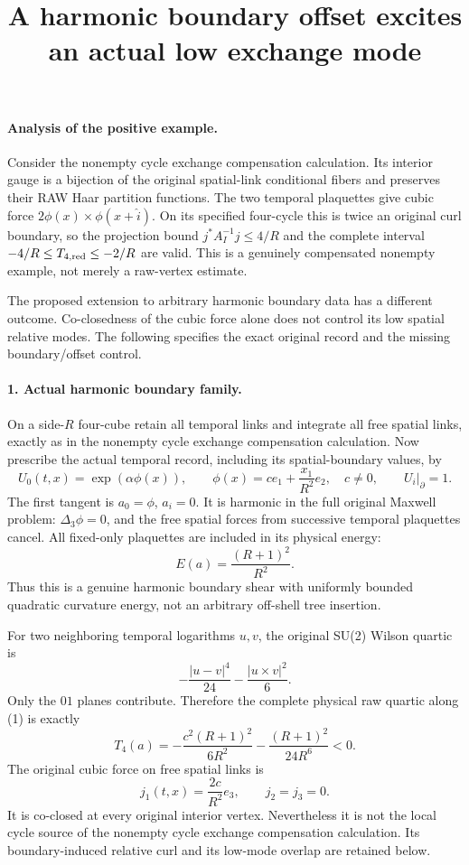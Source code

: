 \documentclass[11pt]{article}
\title{A harmonic boundary offset excites an actual low exchange mode}\author{}\date{}
\begin{document}
\maketitle
\paragraph{Analysis of the positive example.}
Consider the nonempty cycle exchange compensation calculation. Its interior gauge is a bijection
of the original spatial-link conditional fibers and preserves their
RAW Haar partition functions. The two temporal plaquettes give cubic
force $2\phi(x)\times\phi(x+\hat i)$. On its specified four-cycle
this is twice an original curl boundary, so the projection bound
$j^*A_I^{-1}j\le4/R$ and the complete interval
$-4/R\le T_{4,\rm red}\le-2/R$ are valid. This is a genuinely
compensated nonempty example, not merely a raw-vertex estimate.

The proposed extension to arbitrary harmonic boundary data has a
different outcome. Co-closedness of the cubic force alone does not
control its low spatial relative modes. The following specifies the
exact original record and the missing boundary/offset control.

\paragraph{1. Actual harmonic boundary family.}
On a side-$R$ four-cube retain all temporal links and integrate all
free spatial links, exactly as in the nonempty cycle exchange compensation calculation. Now prescribe the actual temporal
record, including its spatial-boundary values, by
\[
 U_0(t,x)=\exp(\alpha\phi(x)),\qquad
 \phi(x)=c e_1+\frac{x_1}{R^2}e_2,\quad c\ne0,
 \qquad U_i|_{\partial}=1 .                                \tag{1}
\]
The first tangent is $a_0=\phi$, $a_i=0$. It is harmonic in the
full original Maxwell problem: $\Delta_3\phi=0$, and the free
spatial forces from successive temporal plaquettes cancel.
All fixed-only plaquettes are included in its physical energy:
\[
 E(a)=\frac{(R+1)^2}{R^2}.                                  \tag{2}
\]
Thus this is a genuine harmonic boundary shear with uniformly bounded
quadratic curvature energy, not an arbitrary off-shell tree insertion.

For two neighboring temporal logarithms $u,v$, the original SU(2)
Wilson quartic is
\[
 -\frac{|u-v|^4}{24}-\frac{|u\times v|^2}{6}.
\]
Only the $01$ planes contribute. Therefore the complete physical raw
quartic along (1) is exactly
\[
 T_4(a)=-\frac{c^2(R+1)^2}{6R^2}
             -\frac{(R+1)^2}{24R^6}<0.                     \tag{3}
\]
The original cubic force on free spatial links is
\[
 j_1(t,x)=\frac{2c}{R^2}e_3,
 \qquad j_2=j_3=0.                                         \tag{4}
\]
It is co-closed at every original interior vertex. Nevertheless it
is not the local cycle source of the nonempty cycle exchange compensation calculation. Its boundary-induced relative
curl and its low-mode overlap are retained below.
\end{document}
